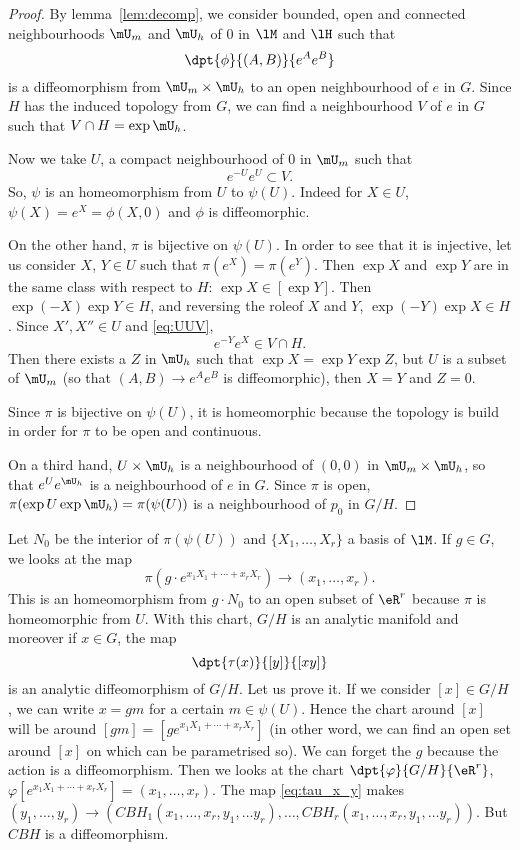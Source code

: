 \begin{proof}
By lemma~\ref{lem:decomp}, we consider bounded, open and connected neighbourhoods $\mU_m$ and $\mU_h$ of $0$ in $\lM$ and $\lH$ such that
\[
  \dpt{\phi}{(A,B)}{e^Ae^B}
\]
is a diffeomorphism from $\mU_m\times\mU_h$ to an open neighbourhood of $e$ in $G$. Since $H$ has the induced topology from $G$, we can find a neighbourhood $V$ of $e$ in $G$ such that $V\cap H=\exp\mU_h$.

Now we take $U$, a compact neighbourhood of $0$ in $\mU_m$ such that
\begin{equation}\label{eq:UUV}
  e^{-U}e^{U}\subset V.
\end{equation}
So, $\psi$ is an homeomorphism from $U$ to $\psi(U)$. Indeed for $X\in U$, $\psi(X)=e^X=\phi(X,0)$ and $\phi$ is diffeomorphic.

On the other hand, $\pi$ is bijective on $\psi(U)$. In order to see that it is injective, let us consider $X$, $Y\in U$ such that $\pi(e^{X})=\pi(e^{Y})$. Then $\exp X$ and $\exp Y$ are in the same class with respect to $H$: $\exp X\in[\exp Y]$. Then $\exp(-X)\exp Y\in H$, and reversing the role\angl of $X$ and $Y$, $\exp(-Y)\exp X\in H$. Since $X',X''\in U$ and \eqref{eq:UUV},
\[
  e^{-Y}e^{X}\in V\cap H.
\]
Then there exists a $Z$ in $\mU_h$ such that $\exp X=\exp Y\exp Z$, but $U$ is a subset of $\mU_m$ (so that $(A,B)\to e^Ae^B$ is diffeomorphic), then $X=Y$ and $Z=0$.

Since $\pi$ is bijective on $\psi(U)$, it is homeomorphic because the topology is build in order for $\pi$ to be open and continuous.

On a third hand, $U\times\mU_h$ is a neighbourhood of $(0,0)$ in $\mU_m\times\mU_h$, so that $e^Ue^{\mU_h}$ is a neighbourhood of $e$ in $G$. Since $\pi$ is open, $\pi(\exp U\exp \mU_h)=\pi(\psi(U))$ is a neighbourhood of $p_0$ in $G/H$.
\end{proof}


Let $N_0$ be the interior of $\pi(\psi(U))$ and $\{X_1,\ldots, X_r\}$ a basis of $\lM$. If $g\in G$, we looks at the map
\[
  \pi(g\cdot e^{x_1X_1+\cdots+x_rX_r})\to(x_1,\ldots,x_r).
\]
This is an homeomorphism from $g\cdot N_0$ to an open subset of $\eR^r$ because $\pi$ is homeomorphic from $U$. With this chart, $G/H$ is an analytic manifold  and moreover if $x\in G$, the map
\begin{equation}\label{eq:tau_x_y}
  \dpt{\tau(x)}{[y]}{[xy]}
\end{equation}
is an analytic diffeomorphism of $G/H$. Let us prove it. If we consider $[x]\in G/H$, we can write $x=gm$ for a certain $m\in\psi(U)$. Hence the chart around $[x]$ will be around $[gm]=[ge^{x_1X_1+\cdots+x_rX_r}]$ (in other word, we can find an open set around $[x]$ on which can be parametrised so). We can forget the $g$ because the action is a diffeomorphism. Then we looks at the chart $\dpt{\varphi}{G/H}{\eR^r}$, $\varphi[e^{x_1X_1+\cdots+x_rX_r}]=(x_1,\ldots,x_r)$. The map \eqref{eq:tau_x_y} makes $(y_1,\ldots,y_r)\to( CBH_1(x_1,\ldots,x_r,y_1,\ldots y_r),\ldots, CBH_r(x_1,\ldots,x_r,y_1,\ldots y_r))$. But $CBH$ is a diffeomorphism.


